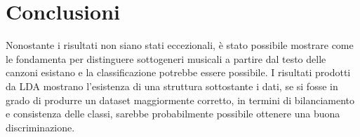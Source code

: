 \documentclass[technote]{IEEEtran}
\begin{document}
\section{Conclusioni}
Nonostante i risultati non siano stati eccezionali, \`e stato possibile
mostrare come le fondamenta per distinguere sottogeneri musicali a
partire dal testo delle canzoni esistano e la classificazione potrebbe
essere possibile. I risultati prodotti da LDA mostrano l'esistenza
di una struttura sottostante i dati, se si fosse in grado di
produrre un dataset maggiormente corretto, in termini di bilanciamento
e consistenza delle classi, sarebbe probabilmente possibile
ottenere una buona discriminazione. 


\end{document}
